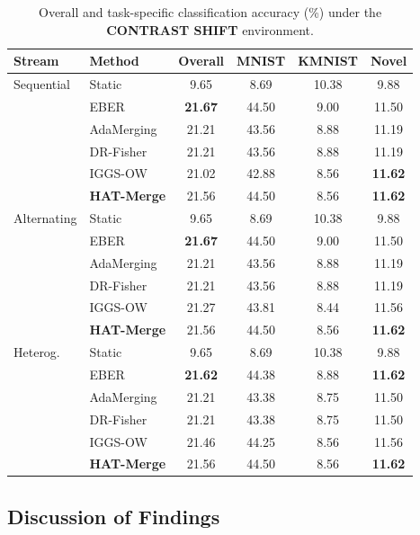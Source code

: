 \documentclass{article}
\theoremstyle{plain}
\theoremstyle{definition}
\theoremstyle{remark}
\begin{document}
\begin{table}[t]
\caption{Overall and task-specific classification accuracy (\%) under the \textbf{CONTRAST SHIFT} environment.}
\label{tab:contrast_results}
\vskip 0.15in
\begin{center}
\begin{footnotesize}
\begin{sc}
\setlength{\tabcolsep}{1.5pt}\begin{tabular}{@{}llcccc@{}}
\toprule
Stream & Method & Overall & MNIST & KMNIST & Novel \\
\midrule
Sequential & Static & 9.65 & 8.69 & 10.38 & 9.88 \\
& EBER & \textbf{21.67} & 44.50 & 9.00 & 11.50 \\
& AdaMerging & 21.21 & 43.56 & 8.88 & 11.19 \\
& DR-Fisher & 21.21 & 43.56 & 8.88 & 11.19 \\
& IGGS-OW & 21.02 & 42.88 & 8.56 & \textbf{11.62} \\
& \textbf{HAT-Merge} & 21.56 & 44.50 & 8.56 & \textbf{11.62} \\
\midrule
Alternating & Static & 9.65 & 8.69 & 10.38 & 9.88 \\
& EBER & \textbf{21.67} & 44.50 & 9.00 & 11.50 \\
& AdaMerging & 21.21 & 43.56 & 8.88 & 11.19 \\
& DR-Fisher & 21.21 & 43.56 & 8.88 & 11.19 \\
& IGGS-OW & 21.27 & 43.81 & 8.44 & 11.56 \\
& \textbf{HAT-Merge} & 21.56 & 44.50 & 8.56 & \textbf{11.62} \\
\midrule
Heterog. & Static & 9.65 & 8.69 & 10.38 & 9.88 \\
& EBER & \textbf{21.62} & 44.38 & 8.88 & \textbf{11.62} \\
& AdaMerging & 21.21 & 43.38 & 8.75 & 11.50 \\
& DR-Fisher & 21.21 & 43.38 & 8.75 & 11.50 \\
& IGGS-OW & 21.46 & 44.25 & 8.56 & 11.56 \\
& \textbf{HAT-Merge} & 21.56 & 44.50 & 8.56 & \textbf{11.62} \\
\bottomrule
\end{tabular}
\end{sc}
\end{footnotesize}
\end{center}
\vskip -0.1in
\end{table}

\subsection{Discussion of Findings}
\label{submission_discussion}
\end{document}
